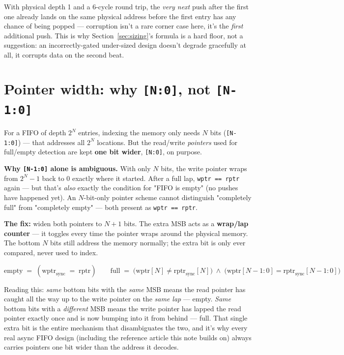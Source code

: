 \documentclass[12pt]{article}
\begin{document}
\begin{warnbox}
With physical depth 1 and a 6-cycle round trip, the \emph{very next} push
after the first one already lands on the same physical address before the
first entry has any chance of being popped — corruption isn't a rare
corner case here, it's the \emph{first} additional push. This is why
Section~\ref{sec:sizing}'s formula is a hard floor, not a suggestion: an
incorrectly-gated under-sized design doesn't degrade gracefully at all, it
corrupts data on the second beat.
\end{warnbox}

\clearpage
\section{Pointer width: why \texttt{[N:0]}, not \texttt{[N-1:0]}}
\label{sec:pointer}

For a FIFO of depth $2^{N}$ entries, indexing the memory only needs $N$
bits (\texttt{[N-1:0]}) — that addresses all $2^N$ locations. But the
read/write \emph{pointers} used for full/empty detection are kept
\textbf{one bit wider}, \texttt{[N:0]}, on purpose.

\begin{warnbox}
\textbf{Why \texttt{[N-1:0]} alone is ambiguous.} With only $N$ bits, the
write pointer wraps from $2^N-1$ back to $0$ exactly where it started.
After a full lap, \texttt{wptr == rptr} again — but that's \emph{also}
exactly the condition for "FIFO is empty" (no pushes have happened yet). An
$N$-bit-only pointer scheme cannot distinguish "completely full" from
"completely empty" — both present as \texttt{wptr == rptr}.
\end{warnbox}

\textbf{The fix:} widen both pointers to $N{+}1$ bits. The extra MSB acts
as a \textbf{wrap/lap counter} — it toggles every time the pointer wraps
around the physical memory. The bottom $N$ bits still address the memory
normally; the extra bit is only ever compared, never used to index.

\[
\text{empty} \;=\; (\text{wptr}_{\text{sync}} \;=\; \text{rptr})
\qquad
\text{full} \;=\; \big(\text{wptr}[N] \neq \text{rptr}_{\text{sync}}[N]\big)
\;\wedge\;
\big(\text{wptr}[N-1:0] = \text{rptr}_{\text{sync}}[N-1:0]\big)
\]

Reading this: \emph{same} bottom bits with the \emph{same} MSB means the
read pointer has caught all the way up to the write pointer on the
\emph{same lap} — empty. \emph{Same} bottom bits with a \emph{different}
MSB means the write pointer has lapped the read pointer exactly once and
is now bumping into it from behind — full. That single extra bit is the
entire mechanism that disambiguates the two, and it's why every real async
FIFO design (including the reference article this note builds on) always
carries pointers one bit wider than the address it decodes.
\end{document}
